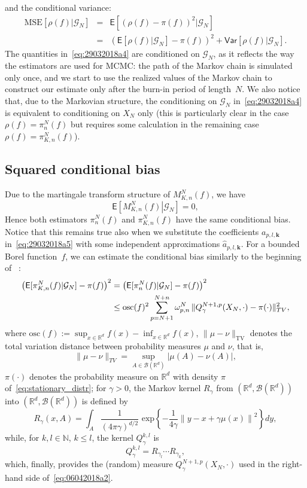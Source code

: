 \documentclass[preprint]{imsart}
\def\TV{\operatorname{TV}}
\begin{document}
and the conditional variance:
\begin{eqnarray}\label{eq:29032018a4}
\mathrm{MSE}\left[\rho(f)|\mathcal G_N\right]
&=&\mathsf{E}\left[(\rho(f)-\pi(f))^2|\mathcal G_N\right]
\\
\nonumber
&=&\left(\mathsf{E}[\rho(f)|\mathcal G_N]-\pi(f)\right)^2
+\mathsf{Var}\left[\rho(f)|\mathcal G_N\right].
\end{eqnarray}
The quantities in~\eqref{eq:29032018a4}
are conditioned on $\mathcal G_N$,
as it reflects the way the estimators are used for MCMC:
the path of the Markov chain is simulated only once,
and we start to use the realized values
of the Markov chain to construct
our estimate only after the burn-in period of length~$N$.
We also notice that, due to the Markovian structure,
the conditioning on $\mathcal G_N$
in~\eqref{eq:29032018a4}
is equivalent to conditioning on $X_N$ only
(this is particularly clear in the case $\rho(f)=\pi_n^N(f)$
but requires some calculation
in the remaining case $\rho(f)=\pi_{K,n}^N(f)$).


\subsection{Squared conditional bias}
Due to the martingale transform structure
of $M_{K,n}^N(f)$,
we have
\[
\mathsf E\left[\left.M_{K,n}^N(f)\right|\mathcal G_N\right]=0,
\]
Hence both estimators
$\pi_n^N(f)$ and $\pi_{K,n}^N(f)$ have the same conditional bias.
Notice that this remains true also when we substitute
the coefficients $a_{p,l,\mathbf{k}}$ in~\eqref{eq:29032018a5}
with some independent approximations $\widehat a_{p,l,\mathbf{k}}.$ For a bounded Borel function~$f$,
we can estimate the conditional bias
similarly to the beginning of ~\cite[Section~4]{durmus:moulines:2017}:
\begin{align}
\left(\mathsf{E}[\pi_{K,n}^N(f)|\mathcal G_N]-\pi(f)\right)^2
&=\left(\mathsf{E}[\pi_{n}^N(f)|\mathcal G_N]-\pi(f)\right)^2
\label{eq:06042018a2}\\
&\le
\mathrm{osc}(f)^2
\sum_{p=N+1}^{N+n}
\omega_{p,n}^N\,
\|Q_\gamma^{N+1,p}(X_N,\cdot)-\pi(\cdot)\|_{TV}^2,
\notag
\end{align}
where
$\mathrm{osc}(f):=\sup_{x\in\mathbb R^d}f(x)-\inf_{x\in\mathbb R^d}f(x)$,
$\|\mu-\nu\|_{\TV}$ denotes the total variation distance
between probability measures $\mu$ and $\nu$, that is,
$$
\|\mu-\nu\|_{TV}=\sup_{A\in\mathcal B(\mathbb R^d)}
|\mu(A)-\nu(A)|,
$$
$\pi(\cdot)$ denotes the probability measure on $\mathbb R^d$
with density $\pi$ of~\eqref{eq:stationary_distr};
for $\gamma>0$, the Markov kernel $R_\gamma$
from $(\mathbb R^d,\mathcal B(\mathbb R^d))$
into $(\mathbb R^d,\mathcal B(\mathbb R^d))$
is defined by
$$
R_\gamma(x,A)=\int_{A} \frac{1}{(4 \pi \gamma)^{d/2}} \text{ exp} \left\{ -\frac{1}{4\gamma} \left\| y - x + \gamma \mu(x)\right\|^2\right\}dy,
$$
while, for $k,l\in\mathbb N$, $k\le l$,
the kernel $Q_\gamma^{k,l}$ is
$$
Q_\gamma^{k,l}=R_{\gamma_l}\cdots R_{\gamma_k},
$$
which, finally, provides the (random) measure
$Q_\gamma^{N+1,p}(X_N,\cdot)$
used in the right-hand side of~\eqref{eq:06042018a2}.
\end{document}
